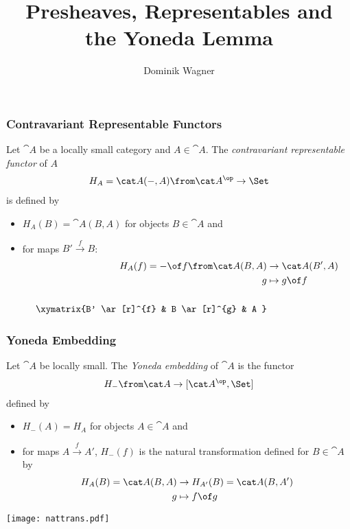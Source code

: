 \documentclass{beamer}
\title{Presheaves, Representables and\\the Yoneda Lemma}
\author{Dominik Wagner}
\begin{document}
\frame{\titlepage}

\begin{frame}
  \frametitle{Contravariant Representable Functors}
  
  Let $\cat A$ be a locally small category and $A\in \cat A$. The \emph{contravariant representable functor} of $A$
  \begin{align*}
    H_A=\cat A(-,A)\from \cat A^\op\to \Set
  \end{align*}
  is defined by
  \begin{itemize}
  \item $H_A(B)=\cat A(B,A)$ for objects $B\in\cat A$ and
  \item for maps $B'\xrightarrow{f} B$:
    \begin{align*}
      H_A(f)=-\of f\from \cat A(B,A)&\to \cat A(B',A)\\
                                      g &\mapsto g\of f\\\\
      \xymatrix{B' \ar[r]^{f} & B \ar[r]^{g} & A }
    \end{align*}
  \end{itemize}
\end{frame}

\begin{frame}
  \frametitle{Yoneda Embedding}
  Let $\cat A$ be locally small. The \emph{Yoneda embedding} of $\cat A$ is the functor
  \begin{align*}
    H_-\from \cat A\to[\cat A^\op,\Set]
  \end{align*}
  defined by
  \begin{itemize}
  \item $H_-(A)=H_A$ for objects $A\in\cat A$ and
  \item for maps $A\xrightarrow{f}A'$, $H_-(f)$ is the natural transformation defined for $B\in \cat A$ by
    \begin{align*}
      H_A(B)=\cat A(B,A)&\to H_{A'}(B)=\cat A(B,A')\\
      g&\mapsto  f\of g\\
    \end{align*}
  \end{itemize}
  \vspace{-0.8cm}
  \texttt{[image: nattrans.pdf]}
\end{frame}
\end{document}
